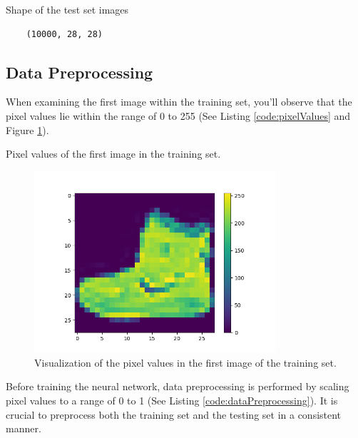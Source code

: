 \begin{code}[h!]
	    
	
	\caption{Shape of the test set images}
	\label{code:testSetShape}
\end{code}

\begin{verbatim}
	(10000, 28, 28)
\end{verbatim}

\subsection{Data Preprocessing}

When examining the first image within the training set, you'll observe that the pixel values lie within the range of 0 to 255 (See Listing \ref{code:pixelValues} and Figure \ref{fig:pixelValues}).

\begin{code}[h!]
	    
	
	\caption{Pixel values of the first image in the training set.}
	\label{code:pixelValues}
\end{code}

\begin{figure}[h!]
	\centering
	\includegraphics[width=0.8\textwidth]{Images/TensorFlowPackage/preprocessData}
	\caption{Visualization of the pixel values in the first image of the training set.} 
	\label{fig:pixelValues}
\end{figure}

Before training the neural network, data preprocessing is performed by scaling pixel values to a range of 0 to 1 (See Listing \ref{code:dataPreprocessing}). It is crucial to preprocess both the training set and the testing set in a consistent manner.

